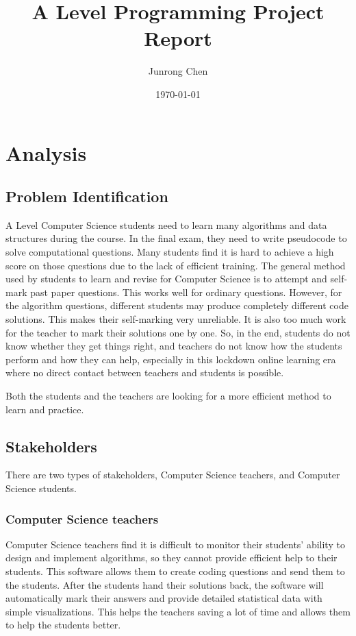 \documentclass[a4paper]{report}
\title{A Level Programming Project Report}
\author{Junrong Chen}
\date{\today}
\begin{document}
\maketitle
\tableofcontents
\clearpage
\chapter{Analysis}

\section{Problem Identification}

A Level Computer Science students need to learn many algorithms and data structures during the course. In the final exam, they need to write pseudocode to solve computational questions. Many students find it is hard to achieve a high score on those questions due to the lack of efficient training. The general method used by students to learn and revise for Computer Science is to attempt and self-mark past paper questions. This works well for ordinary questions. However, for the algorithm questions, different students may produce completely different code solutions. This makes their self-marking very unreliable. It is also too much work for the teacher to mark their solutions one by one. So, in the end, students do not know whether they get things right, and teachers do not know how the students perform and how they can help, especially in this lockdown online learning era where no direct contact between teachers and students is possible.

Both the students and the teachers are looking for a more efficient method to learn and practice.

\section{Stakeholders}

There are two types of stakeholders, Computer Science teachers, and Computer Science students.

\subsection{Computer Science teachers}

Computer Science teachers find it is difficult to monitor their students' ability to design and implement algorithms, so they cannot provide efficient help to their students. This software allows them to create coding questions and send them to the students. After the students hand their solutions back, the software will automatically mark their answers and provide detailed statistical data with simple visualizations. This helps the teachers saving a lot of time and allows them to help the students better.
\end{document}
